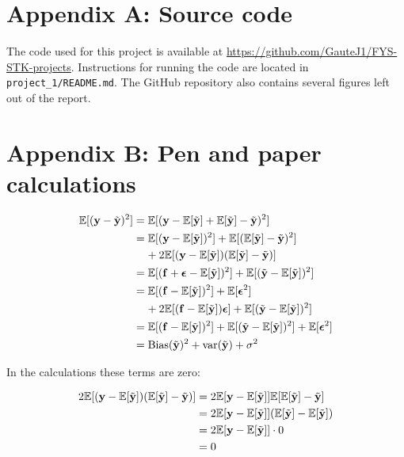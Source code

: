 \section*{Appendix A: Source code}
The code used for this project is available at \url{https://github.com/GauteJ1/FYS-STK-projects}. Instructions for running the code are located in \texttt{ project\_1/README.md}. The GitHub repository also contains several figures left out of the report. 


\section*{Appendix B: Pen and paper calculations}


\begin{align*}
    \fv{(\mathbf{y}-\yt)^2} & = \fv{(\mathbf{y} - \fv{\yt} + \fv{\yt} -\yt)^2} \\
    & = \fv{(\mathbf{y} - \fv{\yt})^2} + \fv{(\fv{\yt} -\yt)^2} \\
    & \;\;\;\; + 2\fv{(\mathbf{y} - \fv{\yt})(\fv{\yt} -\yt)} \\
    & = \fv{(\mathbf{f} + \boldsymbol{\epsilon} - \fv{\yt})^2} + \fv{(\yt - \fv{\yt})^2} \\
    & = \fv{(\mathbf{f}-\fv{\yt})^2}+\fv{\boldsymbol{\epsilon}^2} \\
    & \;\;\;\; + 2\fv{(\mathbf{f}-\fv{\yt})\boldsymbol{\epsilon}} + \fv{(\yt - \fv{\yt})^2}  \\
    & = \fv{(\mathbf{f}-\fv{\yt})^2} + \fv{(\yt - \fv{\yt})^2} +\fv{\boldsymbol{\epsilon}^2}\\
    & = \text{Bias}(\yt)^2 + \text{var}(\yt) + \sigma^2
\end{align*}

In the calculations these terms are zero: 

\begin{align*}
    2\fv{(\mathbf{y} - \fv{\yt})(\fv{\yt} -\yt)} & = 2\fv{\mathbf{y} - \fv{\yt}}\fv{\fv{\yt} -\yt} \\ 
    & = 2\fv{\mathbf{y} - \fv{\yt}} (\fv{\yt}-\fv{\yt}) \\ 
    & = 2\fv{\mathbf{y} - \fv{\yt}} \cdot 0 \\
    & = 0
\end{align*}

